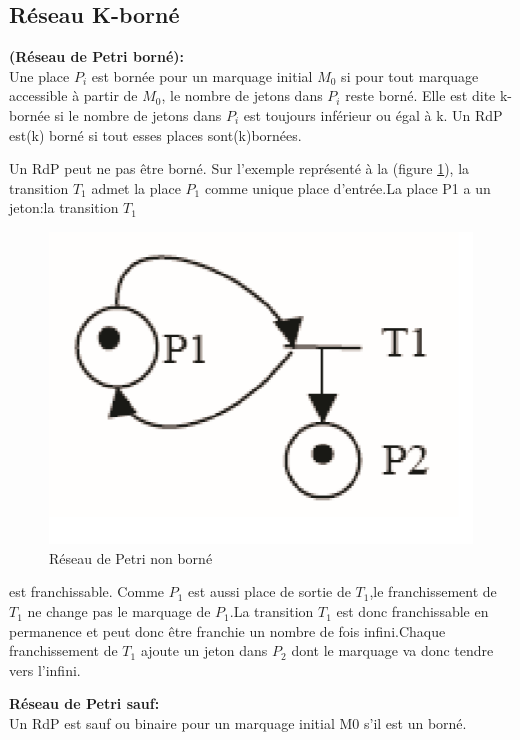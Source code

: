 \subsection{Réseau K-borné }
\begin{defn}\textbf{\textbf{(Réseau de Petri borné):}}\\
	Une place $ P_{i} $ est bornée pour un marquage initial $ M_{0} $ si pour tout marquage accessible à partir de $ M_{0} $, le nombre de jetons dans $P_{i}$ reste borné. Elle est dite k-bornée si le nombre de jetons dans $ P_{i} $ est toujours inférieur ou égal à k. Un RdP est(k) borné si tout esses places sont(k)bornées.
	
\end{defn}

\begin{exmp}
	Un RdP peut ne pas être borné. Sur l'exemple représenté à la (figure \ref{fig:rdpborn}), la transition $ T_{1} $ admet la place $ P_{1} $ comme unique place d'entrée.La place P1 a un jeton:la transition $ T_{1} $
\end{exmp}

\begin{figure}[h]
	\centering
	\includegraphics[width=0.5\linewidth]{images/Rdpborn}
	\caption{Réseau de Petri non borné}
	\label{fig:rdpborn}
\end{figure}

est franchissable. Comme $ P_{1} $ est aussi place de sortie de $ T_{1} $,le franchissement de $ T_{1} $ ne change pas le marquage de $ P_{1} $.La transition $ T_{1} $ est donc franchissable en permanence et peut donc être franchie un nombre de fois infini.Chaque franchissement de $ T_{1} $ ajoute un jeton dans $ P_{2} $ dont le marquage va donc tendre vers l'infini.

\begin{defn}\textbf{Réseau de Petri sauf:}\\
	Un RdP est sauf ou binaire pour un marquage initial M0 s'il est un borné.
	
\end{defn}

